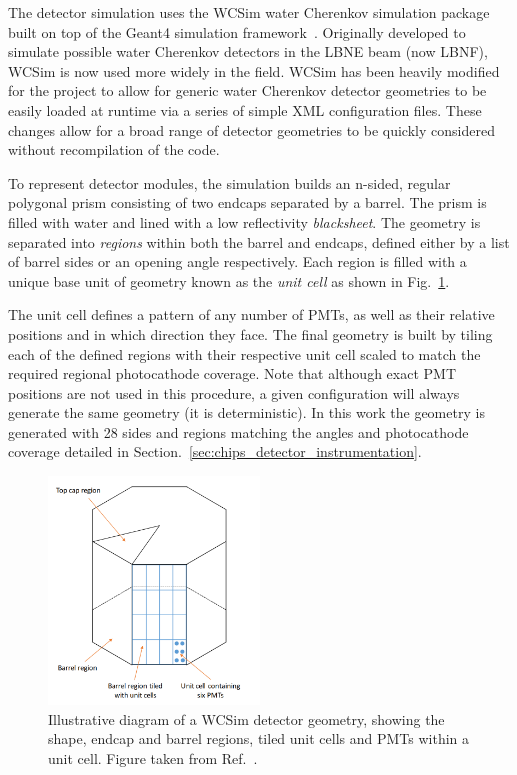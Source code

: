 The detector simulation uses the WCSim water Cherenkov simulation package~\cite{wcsim2020} built
on top of the Geant4 simulation framework~\cite{agostinelli2003, allison2006, Allison2016}.
Originally developed to simulate possible water Cherenkov detectors in the LBNE beam (now LBNF),
WCSim is now used more widely in the field. WCSim has been heavily modified for the \chips project
to allow for generic water Cherenkov detector geometries to be easily loaded at runtime via a
series of simple XML configuration files. These changes allow for a broad range of detector
geometries to be quickly considered without recompilation of the code.

To represent \chips detector modules, the simulation builds an n-sided, regular polygonal prism
consisting of two endcaps separated by a barrel. The prism is filled with water and lined with a
low reflectivity \emph{blacksheet}. The geometry is separated into \emph{regions} within both the
barrel and endcaps, defined either by a list of barrel sides or an opening angle respectively.
Each region is filled with a unique base unit of geometry known as the \emph{unit cell} as shown
in Fig.~\ref{fig:sim_geom}.

The unit cell defines a pattern of any number of PMTs, as well as their relative positions and in
which direction they face. The final geometry is built by tiling each of the defined regions with
their respective unit cell scaled to match the required regional photocathode coverage. Note that
although exact PMT positions are not used in this procedure, a given configuration will always
generate the same geometry (it is deterministic). In this work the \chipsfive geometry is
generated with 28 sides and regions matching the angles and photocathode coverage detailed in
Section.~\ref{sec:chips_detector_instrumentation}.

\begin{figure} %
    \includegraphics[width=0.5\textwidth]{diagrams/4-chips/sim_geom.png}
    \caption[Illustrative diagram of a WCSim detector geometry.]
    {Illustrative diagram of a WCSim detector geometry, showing the shape, endcap and barrel
        regions, tiled unit cells and PMTs within a unit cell. Figure taken from
        Ref.~\cite{blake2016}.}
    \label{fig:sim_geom}
\end{figure}

